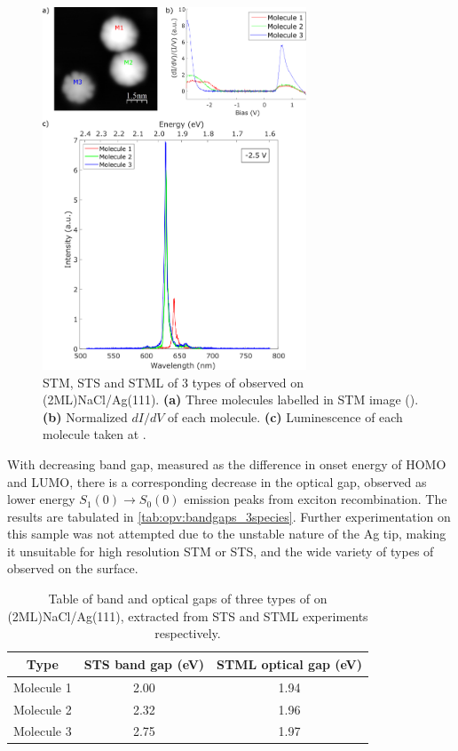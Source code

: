 \begin{figure} [H]
    \centering
        \includegraphics[width=0.7\textwidth]{pictures/3species_diagram.png}
        \caption{STM, STS and STML of 3 types of  observed on (2ML)NaCl/Ag(111). \textbf{(a)} Three molecules labelled in STM image (). \textbf{(b)} Normalized $dI/dV$ of each molecule. \textbf{(c)} Luminescence of each molecule taken at . }
    \label{fig:opv:f8znpc-sts_stml}
\end{figure}


With decreasing band gap, measured as the difference in onset energy of HOMO and LUMO, there is a corresponding decrease in the optical gap, observed as lower energy $S_1(0) \rightarrow S_0(0)$ emission peaks from exciton recombination. The results are tabulated in \autoref{tab:opv:bandgaps_3species}. Further experimentation on this sample was not attempted due to the unstable nature of the Ag tip, making it unsuitable for high resolution \ac{STM} or \ac{STS}, and the wide variety of types of  observed on the surface.
 
 \begin{table}
\begin{center}
    \begin{tabular}{|c|c|c|} 
    \hline
        Type  & STS band gap (eV)  &  STML optical gap (eV) \\
        \hline
        Molecule 1  &    2.00   & 1.94   \\
        Molecule 2  &    2.32   & 1.96 \\
        Molecule 3  &    2.75   & 1.97 \\
        \hline
    \end{tabular}
    \caption{Table of band and optical gaps of three types of  on (2ML)NaCl/Ag(111), extracted from STS and STML experiments respectively.}
    \label{tab:opv:bandgaps_3species}
    \end{center}
\end{table}


